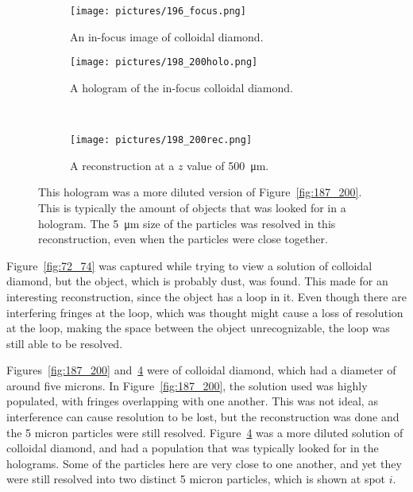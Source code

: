 \clearpage


\begin{figure}[ht!]
    \begin{center}

        \begin{subfigure}[t]{0.4\textwidth}
            \label{fig:196_focus}
            \texttt{[image: pictures/196\_focus.png]}
            \caption{An in-focus image of colloidal diamond.}
        \end{subfigure}
                \hspace*{\fill}
        \begin{subfigure}[t]{0.4\textwidth}
            \label{fig:198_200holo}
            \texttt{[image: pictures/198\_200holo.png]}
            \caption{A hologram of the in-focus colloidal diamond.}
        \end{subfigure}
        \\
        \begin{subfigure}[t]{\textwidth}
            \label{fig:198_200rec}
            \texttt{[image: pictures/198\_200rec.png]}
            \caption{A reconstruction at a $z$ value of \SI{500}{\micro\meter}.}
        \end{subfigure}


    \end{center}
    \caption{%
        This hologram was a more diluted version of
        Figure~\ref{fig:187_200}. This is typically the amount of objects that
        was looked for in a hologram. The \SI{5}{\micro\meter} size of the
        particles was resolved in this reconstruction, even when the particles
        were close together.
    }%
    \label{fig:198_200}
\end{figure}



Figure~\ref{fig:72_74} was captured while trying to view a solution of
colloidal diamond, but the object, which is probably dust, was found. This made
for an interesting reconstruction, since the object has a loop in it. Even
though there are interfering fringes at the loop, which was thought might cause
a loss of resolution at the loop, making the space between the object
unrecognizable, the loop was still able to be resolved.

Figures~\ref{fig:187_200} and~\ref{fig:198_200} were of colloidal diamond,
which had a diameter of around five microns. In Figure~\ref{fig:187_200}, the
solution used was highly populated, with fringes overlapping with one another.
This was not ideal, as interference can cause resolution to be lost, but the
reconstruction was done and the 5 micron particles were still resolved.
Figure~\ref{fig:198_200} was a more diluted solution of colloidal diamond, and
had a population that was typically looked for in the holograms. Some of the
particles here are very close to one another, and yet they were still resolved
into two distinct 5 micron particles, which is shown at spot $i$.









%
